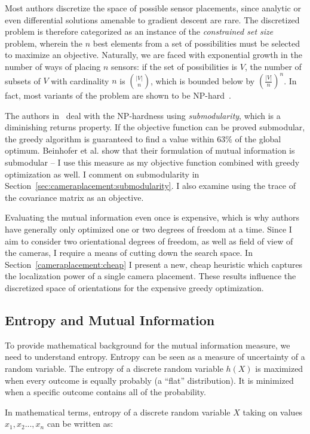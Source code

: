 \documentclass[a4paper,12pt,twoside,openright]{report}
\begin{document}
Most authors discretize the space of possible sensor placements, since analytic or
even differential solutions amenable to gradient descent are rare. The discretized
problem is therefore categorized as an instance of the \textit{constrained set size} problem,
wherein the $n$ best elements from a set of possibilities must be selected to maximize an objective.
Naturally, we are faced with exponential growth in the number of ways of placing
$n$ sensors: if the set of possibilities is $V$, the number of subsets of $V$ with cardinality
$n$ is $|V| \choose n$, which is bounded below by $(\frac{|V|}{n})^n$. In fact, most variants 
of the problem are shown to be NP-hard~\cite{beinhofer2014landmark}.

The authors in~\cite{beinhofer2011near} deal with the NP-hardness 
using \textit{submodularity}, which is a diminishing returns property.
If the objective function can be proved submodular, the greedy
algorithm is guaranteed to find a value within 63\% of the global optimum.
Beinhofer et al. show that their formulation of mutual information is submodular --
I use this measure as my objective function combined with greedy optimization as well.
I comment on submodularity in Section~\ref{sec:cameraplacement:submodularity}. I also
examine using the trace of the covariance matrix as an objective.

Evaluating the mutual information even once is expensive, which is why authors have generally
only optimized one or two degrees of freedom at a time. Since I aim
to consider two orientational degrees of freedom, as well as field of view of the cameras, 
I require a means of cutting down the search space. In Section~\ref{cameraplacement:cheap} 
I present a new, cheap heuristic which captures the localization power of a single camera placement.
These results influence the discretized space of orientations for the expensive greedy optimization.


\subsection{Entropy and Mutual Information}
To provide mathematical background for the mutual information measure, we need to understand entropy.
Entropy can be seen as a measure of uncertainty of a random variable. 
The entropy of a discrete random variable $h(X)$ is maximized when
every outcome is equally probably (a ``flat'' distribution).
It is minimized when a specific outcome contains all of the probability.

In mathematical terms, entropy of a discrete random variable $X$ taking on values
${x_1, x_2..., x_n}$ can be written as:
\end{document}
